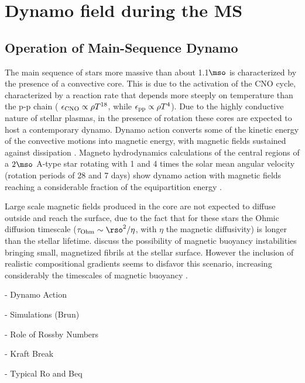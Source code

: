 
\section{Dynamo field during the MS}
\subsection{Operation of Main-Sequence Dynamo}\label{dynamo}
The main sequence of stars more massive than about 1.1$\mso$ is characterized by the presence of a convective core.
This is due to the activation of the CNO cycle, characterized by a reaction rate that depends more steeply on temperature than the p-p chain ( $\epsilon_{\rm CNO}\propto \rho T^{18}$, while  $\epsilon_{\rm pp}\propto \rho T^{4}$).
Due to the highly conductive nature of stellar plasmas, in the presence of rotation
these cores are expected to host a contemporary dynamo. Dynamo action converts some of the kinetic energy 
of the convective motions into magnetic energy, with magnetic fields sustained against dissipation \citep[see e.g.,][]{Brandenburg_2005}.
Magneto hydrodynamics calculations of the central regions of a  $2\mso$ A-type star rotating with 
1 and 4 times the solar mean angular velocity (rotation periods of 28 and 7 days) show dynamo action 
with magnetic fields reaching a considerable fraction of the equipartition energy \citep{Brun_2005}.

Large scale magnetic fields produced in the core are not expected to diffuse outside and reach the surface, due to the fact that for these stars the Ohmic diffusion timescale ($\tau_{\rm Ohm}\sim \rso^2/\eta$, with $\eta$ the magnetic diffusivity) is longer than the stellar lifetime. \citet{MacGregor_2003} discuss the possibility of magnetic buoyancy instabilities bringing small, magnetized fibrils  at the stellar surface. However the inclusion of realistic compositional gradients seems to disfavor this scenario, increasing considerably the timescales of magnetic buoyancy \cite{MacDonald_2004}.  



- Dynamo Action

- Simulations (Brun)

- Role of Rossby Numbers

- Kraft Break
  
- Typical Ro and Beq   
  
  
  
  
  
  
  
  
  